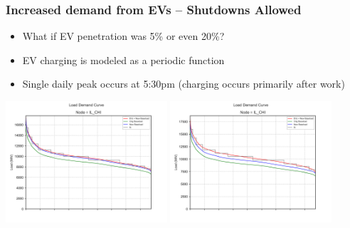 \documentclass[xcolor=dvipsnames]{beamer}
\begin{document}
\begin{frame}  \frametitle{Increased demand from EVs -- Shutdowns Allowed}
\begin{itemize}
  \item What if EV penetration was 5\% or even 20\%?
  \item EV charging is modeled as a periodic function
  \item Single daily peak occurs at 5:30pm (charging occurs primarily after work)
\end{itemize}

\includegraphics[width=0.45\textwidth]{includes/LDC_5pct_EVs_IL_CHI.png}    
\includegraphics[width=0.45\textwidth]{includes/LDC_20pct_EVs_IL_CHI.png}    
      
\end{frame}
\end{document}
